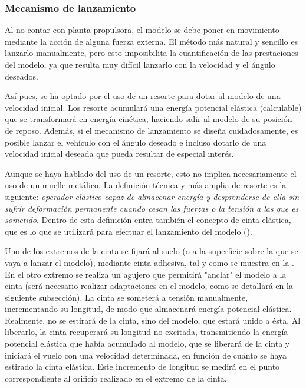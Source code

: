 \subsubsection{Mecanismo de lanzamiento}
\label{sec:tests:preparation:mechanism}

Al no contar con planta propulsora, el modelo se debe poner en movimiento mediante la acción de alguna fuerza externa. El método más natural y sencillo es lanzarlo manualmente, pero esto imposibilita la cuantificación de las prestaciones del modelo, ya que resulta muy difícil lanzarlo con la velocidad y el ángulo deseados.

Así pues, se ha optado por el uso de un resorte para dotar al modelo de una velocidad inicial. Los resorte acumulará una energía potencial elástica (calculable) que se transformará en energía cinética, haciendo salir al modelo de su posición de reposo. Además, si el mecanismo de lanzamiento se diseña cuidadosamente, es posible lanzar el vehículo con el ángulo deseado e incluso dotarlo de una velocidad inicial deseada que pueda resultar de especial interés.

Aunque se haya hablado del uso de un resorte, esto no implica necesariamente el uso de un muelle metálico. La definición técnica y más amplia de resorte es la siguiente:\cite{ref:resorte} \emph{operador elástico capaz de almacenar energía y desprenderse de ella sin sufrir deformación permanente cuando cesan las fuerzas o la tensión a las que es sometido}. Dentro de esta definición entra también el concepto de cinta elástica, que es lo que se utilizará para efectuar el lanzamiento del modelo ().

Uno de los extremos de la cinta se fijará al suelo (o a la superficie sobre la que se vaya a lanzar el modelo), mediante cinta adhesiva, tal y como se muestra en la . En el otro extremo se realiza un agujero que permitirá "anclar" el modelo a la cinta (será necesario realizar adaptaciones en el modelo, como se detallará en la siguiente subsección). La cinta se someterá a tensión manualmente, incrementando su longitud, de modo que almacenará energía potencial elástica. Realmente, no se estirará de la cinta, sino del modelo, que estará unido a ésta. Al liberarlo, la cinta recuperará su longitud no excitada, transmitiendo la energía potencial elástica que había acumulado al modelo, que se liberará de la cinta y iniciará el vuelo con una velocidad determinada, en función de cuánto se haya estirado la cinta elástica. Este incremento de longitud se medirá en el punto correspondiente al orificio realizado en el extremo de la cinta.


